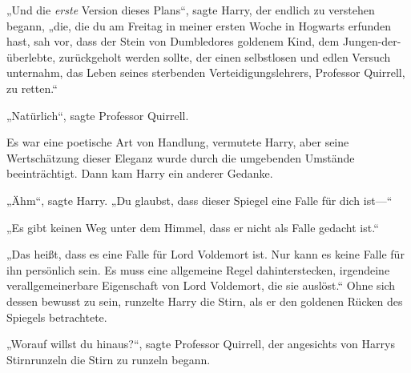 „Und die \emph{erste} Version dieses Plans“, sagte Harry, der endlich zu verstehen begann, „die, die du am Freitag in meiner ersten Woche in Hogwarts erfunden hast, sah vor, dass der Stein von Dumbledores goldenem Kind, dem Jungen-der-überlebte, zurückgeholt werden sollte, der einen selbstlosen und edlen Versuch unternahm, das Leben seines sterbenden Verteidigungslehrers, Professor Quirrell, zu retten.“

„Natürlich“, sagte Professor Quirrell.

Es war eine poetische Art von Handlung, vermutete Harry, aber seine Wertschätzung dieser Eleganz wurde durch die umgebenden Umstände beeinträchtigt.
Dann kam Harry ein anderer Gedanke.

„Ähm“, sagte Harry. „Du glaubst, dass dieser Spiegel eine Falle für dich ist—“

„Es gibt keinen Weg unter dem Himmel, dass er nicht als Falle gedacht ist.“

„Das heißt, dass es eine Falle für Lord Voldemort ist. Nur kann es keine Falle für ihn persönlich sein. Es muss eine allgemeine Regel dahinterstecken, irgendeine verallgemeinerbare Eigenschaft von Lord Voldemort, die sie auslöst.“
Ohne sich dessen bewusst zu sein, runzelte Harry die Stirn, als er den goldenen Rücken des Spiegels betrachtete.

„Worauf willst du hinaus?“, sagte Professor Quirrell, der angesichts von Harrys Stirnrunzeln die Stirn zu runzeln begann.

